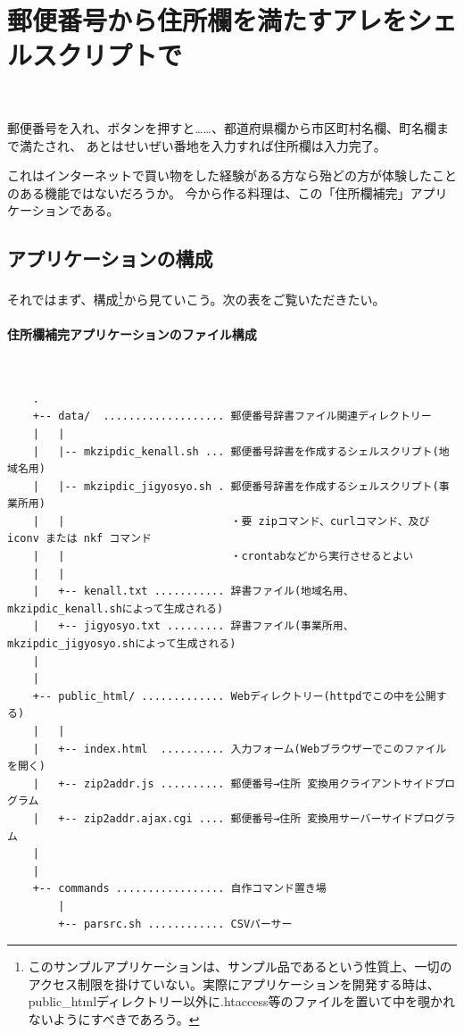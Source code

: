 \section*{郵便番号から住所欄を満たすアレをシェルスクリプトで}

\noindent
$\!\!\!\!\!$
\begin{grshfboxit}{160.0mm}
	郵便番号を入れ、ボタンを押すと……、都道府県欄から市区町村名欄、町名欄まで満たされ、
	あとはせいぜい番地を入力すれば住所欄は入力完了。
\end{grshfboxit}

これはインターネットで買い物をした経験がある方なら殆どの方が体験したことのある機能ではないだろうか。
今から作る料理は、この「住所欄補完」アプリケーションである。

\subsection*{アプリケーションの構成}

それではまず、構成\footnote{このサンプルアプリケーションは、サンプル品であるという性質上、一切のアクセス制限を掛けていない。実際にアプリケーションを開発する時は、public\_{}htmlディレクトリー以外に.htaccess等のファイルを置いて中を覗かれないようにすべきであろう。}から見ていこう。次の表をご覧いただきたい。

\paragraph{住所欄補完アプリケーションのファイル構成} 　\\
\begin{frameboxit}{160.0mm}
\begin{verbatim}
	.
	+-- data/  ................... 郵便番号辞書ファイル関連ディレクトリー
	|   |
	|   |-- mkzipdic_kenall.sh ... 郵便番号辞書を作成するシェルスクリプト(地域名用)
	|   |-- mkzipdic_jigyosyo.sh . 郵便番号辞書を作成するシェルスクリプト(事業所用)
	|   |                          ・要 zipコマンド、curlコマンド、及び iconv または nkf コマンド
	|   |                          ・crontabなどから実行させるとよい
	|   |
	|   +-- kenall.txt ........... 辞書ファイル(地域名用、mkzipdic_kenall.shによって生成される)
	|   +-- jigyosyo.txt ......... 辞書ファイル(事業所用、mkzipdic_jigyosyo.shによって生成される)
	|
	|
	+-- public_html/ ............. Webディレクトリー(httpdでこの中を公開する)
	|   |
	|   +-- index.html  .......... 入力フォーム(Webブラウザーでこのファイルを開く)
	|   +-- zip2addr.js .......... 郵便番号→住所 変換用クライアントサイドプログラム
	|   +-- zip2addr.ajax.cgi .... 郵便番号→住所 変換用サーバーサイドプログラム
	|
	|
	+-- commands ................. 自作コマンド置き場
	    |
	    +-- parsrc.sh ............ CSVパーサー
\end{verbatim}
\end{frameboxit}

